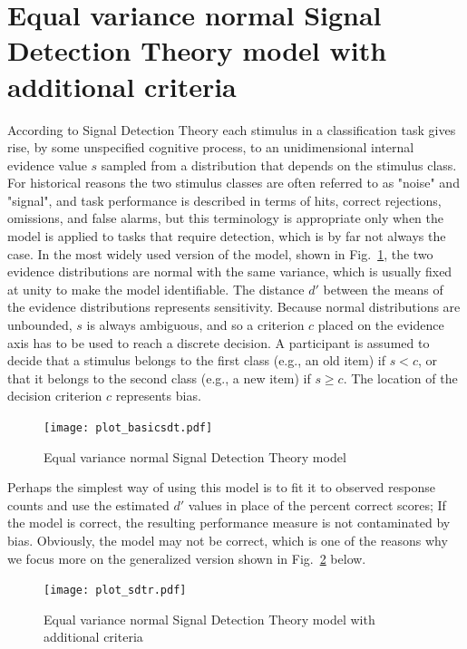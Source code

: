 \documentclass[oneside,a4paper]{article}
\begin{document}
\section{Equal variance normal Signal Detection Theory model with
  additional criteria}

According to Signal Detection Theory each stimulus in a classification
task gives rise, by some unspecified cognitive process, to an
unidimensional internal evidence value $s$ sampled from
a distribution that depends on the stimulus class. For historical
reasons the two stimulus classes are often referred to as "noise" and
"signal", and task performance is described in terms of hits, correct
rejections, omissions, and false alarms, but this terminology is
appropriate only when the model is applied to tasks that require
detection, which is by far not always the case. In the most widely
used version of the model, shown in Fig.~\ref{basicsdt}, the two
evidence distributions are normal with the same variance, which is
usually fixed at unity to make the model identifiable. The distance
$d'$ between the means of the
evidence distributions represents sensitivity. Because normal
distributions are unbounded, $s$ is always ambiguous, and so a
criterion $c$ placed on the evidence axis has to be used to reach a
discrete
decision. A participant is assumed to decide that a stimulus belongs
to the first class (e.g., an old item) if $s < c$, or that it belongs
to the second class (e.g., a new item) if $s \geq c$. The location of
the decision criterion $c$ represents bias.


\begin{figure}[H]
  \centering
  \texttt{[image: plot\_basicsdt.pdf]}
  \caption{Equal variance normal Signal Detection Theory model}
  \label{basicsdt}
\end{figure}


Perhaps the simplest way of using this model is to fit it to observed
response counts and use the estimated $d'$ values in place of the
percent correct scores; If the model is correct, the resulting
performance measure is not contaminated by bias. Obviously, the model
may not be correct, which is one of the reasons why we focus more on
the generalized version shown in Fig.~\ref{sdtr} below.


\begin{figure}[H]
  \centering
  \texttt{[image: plot\_sdtr.pdf]}
  \caption{Equal variance normal Signal Detection Theory model with
    additional criteria}
  \label{sdtr}
\end{figure}
\end{document}
